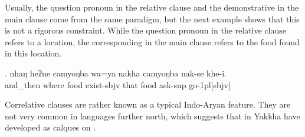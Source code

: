 	
Usually, the question pronoun in the relative clause and the demonstrative in the main clause come from the same paradigm, but the next example shows that this is not a rigorous constraint. While the question pronoun in the relative clause refers to a location, the corresponding  in the main clause refers to the food found in this location.	
		
	\exg. nhaŋ   heʔne  camyoŋba wa=ya nakha camyoŋba nak-se khe-i.\\
		and\_then where food exist{\sc [3sg]-sbjv} that  food ask-{\sc sup} go{\sc -1pl[sbjv]}\\
		 


Correlative clauses are rather known as a typical Indo-Aryan feature. They are not very common in  languages further north, which suggests that  in Yakkha have developed as calques on  . 
 